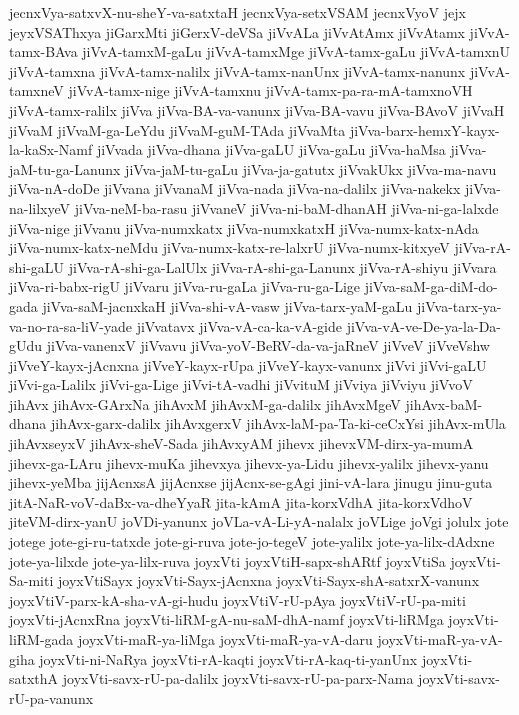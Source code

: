{jecnxVya-satxvX-nu-sheY-va-satxtaH
jecnxVya-setxVSAM
jecnxVyoV
jejx
jeyxVSAThxya
jiGarxMti
jiGerxV-deVSa
jiVvALa
jiVvAtAmx
jiVvAtamx
jiVvA-tamx-BAva
jiVvA-tamxM-gaLu
jiVvA-tamxMge
jiVvA-tamx-gaLu
jiVvA-tamxnU
jiVvA-tamxna
jiVvA-tamx-nalilx
jiVvA-tamx-nanUnx
jiVvA-tamx-nanunx
jiVvA-tamxneV
jiVvA-tamx-nige
jiVvA-tamxnu
jiVvA-tamx-pa-ra-mA-tamxnoVH
jiVvA-tamx-ralilx
jiVva
jiVva-BA-va-vanunx
jiVva-BA-vavu
jiVva-BAvoV
jiVvaH
jiVvaM
jiVvaM-ga-LeYdu
jiVvaM-guM-TAda
jiVvaMta
jiVva-barx-hemxY-kayx-la-kaSx-Namf
jiVvada
jiVva-dhana
jiVva-gaLU
jiVva-gaLu
jiVva-haMsa
jiVva-jaM-tu-ga-Lanunx
jiVva-jaM-tu-gaLu
jiVva-ja-gatutx
jiVvakUkx
jiVva-ma-navu
jiVva-nA-doDe
jiVvana
jiVvanaM
jiVva-nada
jiVva-na-dalilx
jiVva-nakekx
jiVva-na-lilxyeV
jiVva-neM-ba-rasu
jiVvaneV
jiVva-ni-baM-dhanAH
jiVva-ni-ga-lalxde
jiVva-nige
jiVvanu
jiVva-numxkatx
jiVva-numxkatxH
jiVva-numx-katx-nAda
jiVva-numx-katx-neMdu
jiVva-numx-katx-re-lalxrU
jiVva-numx-kitxyeV
jiVva-rA-shi-gaLU
jiVva-rA-shi-ga-LalUlx
jiVva-rA-shi-ga-Lanunx
jiVva-rA-shiyu
jiVvara
jiVva-ri-babx-rigU
jiVvaru
jiVva-ru-gaLa
jiVva-ru-ga-Lige
jiVva-saM-ga-diM-do-gada
jiVva-saM-jacnxkaH
jiVva-shi-vA-vasw
jiVva-tarx-yaM-gaLu
jiVva-tarx-ya-va-no-ra-sa-liV-yade
jiVvatavx
jiVva-vA-ca-ka-vA-gide
jiVva-vA-ve-De-ya-la-Da-gUdu
jiVva-vanenxV
jiVvavu
jiVva-yoV-BeRV-da-va-jaRneV
jiVveV
jiVveVshw
jiVveY-kayx-jAcnxna
jiVveY-kayx-rUpa
jiVveY-kayx-vanunx
jiVvi
jiVvi-gaLU
jiVvi-ga-Lalilx
jiVvi-ga-Lige
jiVvi-tA-vadhi
jiVvituM
jiVviya
jiVviyu
jiVvoV
jihAvx
jihAvx-GArxNa
jihAvxM
jihAvxM-ga-dalilx
jihAvxMgeV
jihAvx-baM-dhana
jihAvx-garx-dalilx
jihAvxgerxV
jihAvx-laM-pa-Ta-ki-ceCxYsi
jihAvx-mUla
jihAvxseyxV
jihAvx-sheV-Sada
jihAvxyAM
jihevx
jihevxVM-dirx-ya-mumA
jihevx-ga-LAru
jihevx-muKa
jihevxya
jihevx-ya-Lidu
jihevx-yalilx
jihevx-yanu
jihevx-yeMba
jijAcnxsA
jijAcnxse
jijAcnx-se-gAgi
jini-vA-lara
jinugu
jinu-guta
jitA-NaR-voV-daBx-va-dheYyaR
jita-kAmA
jita-korxVdhA
jita-korxVdhoV
jiteVM-dirx-yanU
joVDi-yanunx
joVLa-vA-Li-yA-nalalx
joVLige
joVgi
jolulx
jote
jotege
jote-gi-ru-tatxde
jote-gi-ruva
jote-jo-tegeV
jote-yalilx
jote-ya-lilx-dAdxne
jote-ya-lilxde
jote-ya-lilx-ruva
joyxVti
joyxVtiH-sapx-shARtf
joyxVtiSa
joyxVti-Sa-miti
joyxVtiSayx
joyxVti-Sayx-jAcnxna
joyxVti-Sayx-shA-satxrX-vanunx
joyxVtiV-parx-kA-sha-vA-gi-hudu
joyxVtiV-rU-pAya
joyxVtiV-rU-pa-miti
joyxVti-jAcnxRna
joyxVti-liRM-gA-nu-saM-dhA-namf
joyxVti-liRMga
joyxVti-liRM-gada
joyxVti-maR-ya-liMga
joyxVti-maR-ya-vA-daru
joyxVti-maR-ya-vA-giha
joyxVti-ni-NaRya
joyxVti-rA-kaqti
joyxVti-rA-kaq-ti-yanUnx
joyxVti-satxthA
joyxVti-savx-rU-pa-dalilx
joyxVti-savx-rU-pa-parx-Nama
joyxVti-savx-rU-pa-vanunx
}
